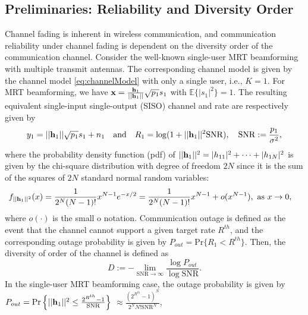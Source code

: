 \documentclass[11pt, draft, onecolumn ]{IEEEtran}
\begin{document}
\subsection{Preliminaries: Reliability and Diversity Order}
\label{subsec:prelim}



Channel fading is inherent in wireless communication, and communication reliability under channel fading is  dependent on the diversity order of the communication channel.
Consider the well-known single-user
 MRT beamforming with multiple transmit antennas. The corresponding channel model is given by  the channel model \eqref{eq:channelModel} with only a single user, i.e., $K=1$. For MRT beamforming, we have ${\bf x} = \frac{{\bf h}_1}{||{\bf h}_1||}\sqrt{p_1}s_1$ with ${\mathbb{E}}\{|s_1|^2\}=1$. The resulting equivalent single-input single-output (SISO) channel and rate are respectively given by
\begin{equation}  \label{eq:MRTsisoEQ}
y_1 = ||{\bf h}_1|| \sqrt{p_1}s_1 + n_1 ~~~\mbox{and}~~~
R_1= \log ( 1 + ||{\bf h}_1||^2 \mathrm{SNR}), ~~~\mathrm{SNR}:= \frac{p_1}{\sigma^2},
\end{equation}
where the probability density function (pdf) of $||{\bf h}_1||^2 = |h_{11}|^2 + \cdots + |h_{1N}|^2$ is given by the chi-square distribution with degree of freedom $2N$ since it is the sum of the squares of $2N$ standard normal random variables:
\begin{align}  \label{eq:ChiSquare2N}
f_{||{\bf h}_1||^2}(x) &= \frac{1}{2^N(N-1)!}x^{N-1}e^{-x/2}=\frac{1}{2^N(N-1)!}x^{N-1} + o(x^{N-1}), ~\mbox{as}~x\rightarrow 0,
\end{align}
where $o(\cdot)$ is the small o notation.
Communication outage is defined as the event that the channel cannot support a given target rate $R^{th}$, and  the corresponding outage probability is given by
$P_{out} = \mathrm{Pr}\{ R_1 < R^{th}   \}$\cite{Tse:book}.
Then, the diversity of order of the channel is defined as  \cite{Tse:book}
\begin{equation}
D := - \lim_{\mathrm{SNR}\rightarrow \infty} \frac{\log P_{out}}{\log\mathrm{SNR}}.
\end{equation}
In the single-user MRT beamforming case, the outage probability  is given by
$P_{out} = \mathrm{Pr}\left\{ ||{\bf h}_1||^2  \le \frac{2^{R^{th}}-1}{\mathrm{SNR}} \right\}$ $\approx \frac{(2^{R^{th}}-1)^N}{2^N N! \mathrm{SNR}^N}$\cite{Tse:book},
\end{document}
